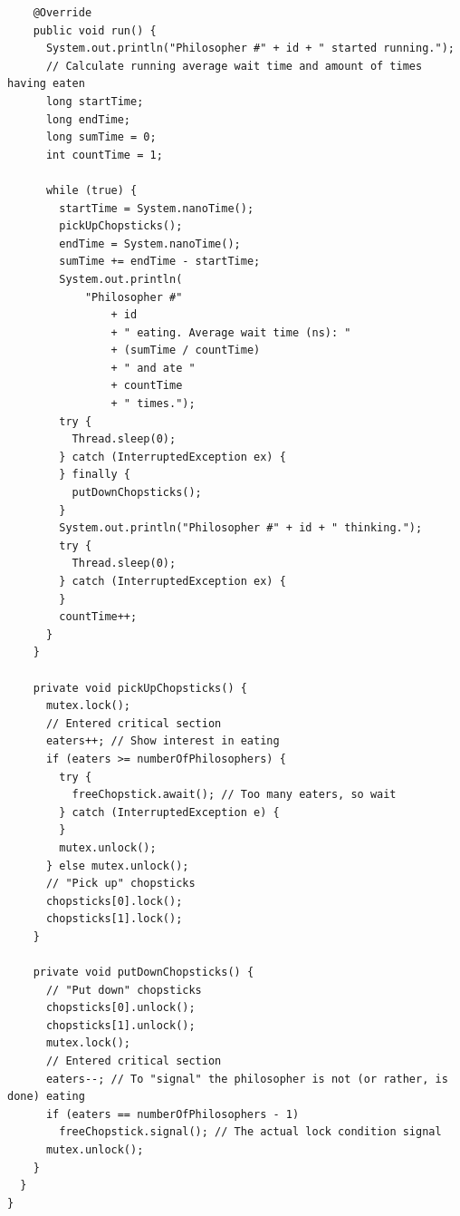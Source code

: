 \documentclass[11pt,letterpaper]{exam}
\begin{document}
\begin{lstlisting}
    @Override
    public void run() {
      System.out.println("Philosopher #" + id + " started running.");
      // Calculate running average wait time and amount of times having eaten
      long startTime;
      long endTime;
      long sumTime = 0;
      int countTime = 1;

      while (true) {
        startTime = System.nanoTime();
        pickUpChopsticks();
        endTime = System.nanoTime();
        sumTime += endTime - startTime;
        System.out.println(
            "Philosopher #"
                + id
                + " eating. Average wait time (ns): "
                + (sumTime / countTime)
                + " and ate "
                + countTime
                + " times.");
        try {
          Thread.sleep(0);
        } catch (InterruptedException ex) {
        } finally {
          putDownChopsticks();
        }
        System.out.println("Philosopher #" + id + " thinking.");
        try {
          Thread.sleep(0);
        } catch (InterruptedException ex) {
        }
        countTime++;
      }
    }

    private void pickUpChopsticks() {
      mutex.lock();
      // Entered critical section
      eaters++; // Show interest in eating
      if (eaters >= numberOfPhilosophers) {
        try {
          freeChopstick.await(); // Too many eaters, so wait
        } catch (InterruptedException e) {
        }
        mutex.unlock();
      } else mutex.unlock();
      // "Pick up" chopsticks
      chopsticks[0].lock();
      chopsticks[1].lock();
    }

    private void putDownChopsticks() {
      // "Put down" chopsticks
      chopsticks[0].unlock();
      chopsticks[1].unlock();
      mutex.lock();
      // Entered critical section
      eaters--; // To "signal" the philosopher is not (or rather, is done) eating
      if (eaters == numberOfPhilosophers - 1)
        freeChopstick.signal(); // The actual lock condition signal
      mutex.unlock();
    }
  }
}
\end{lstlisting}
\end{document}
